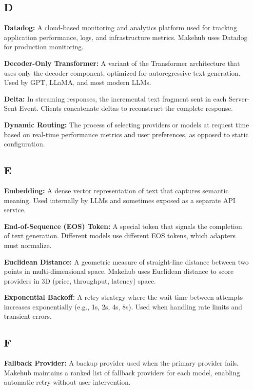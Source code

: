 \documentclass[english]{article}
\begin{document}
\subsection*{D}

\textbf{Datadog:} A cloud-based monitoring and analytics platform used for tracking application performance, logs, and infrastructure metrics. Makehub uses Datadog for production monitoring.

\textbf{Decoder-Only Transformer:} A variant of the Transformer architecture that uses only the decoder component, optimized for autoregressive text generation. Used by GPT, LLaMA, and most modern LLMs.

\textbf{Delta:} In streaming responses, the incremental text fragment sent in each Server-Sent Event. Clients concatenate deltas to reconstruct the complete response.

\textbf{Dynamic Routing:} The process of selecting providers or models at request time based on real-time performance metrics and user preferences, as opposed to static configuration.

\subsection*{E}

\textbf{Embedding:} A dense vector representation of text that captures semantic meaning. Used internally by LLMs and sometimes exposed as a separate API service.

\textbf{End-of-Sequence (EOS) Token:} A special token that signals the completion of text generation. Different models use different EOS tokens, which adapters must normalize.

\textbf{Euclidean Distance:} A geometric measure of straight-line distance between two points in multi-dimensional space. Makehub uses Euclidean distance to score providers in 3D (price, throughput, latency) space.

\textbf{Exponential Backoff:} A retry strategy where the wait time between attempts increases exponentially (e.g., 1s, 2s, 4s, 8s). Used when handling rate limits and transient errors.

\subsection*{F}

\textbf{Fallback Provider:} A backup provider used when the primary provider fails. Makehub maintains a ranked list of fallback providers for each model, enabling automatic retry without user intervention.
\end{document}
